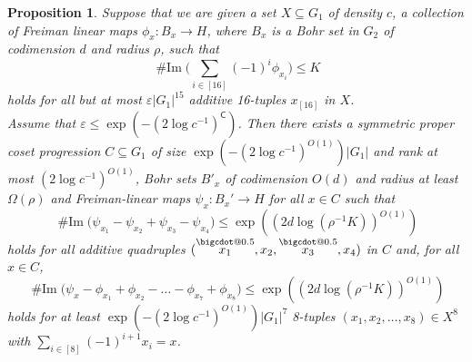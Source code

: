 \documentclass[a4paper,11pt]{article}
\makeatletter
\numberwithin{theorem}{section}
\newtheorem{proposition}[theorem]{Proposition}
\theoremstyle{definition}
\newcommand{\on}[1]{
	\operatorname{#1}
}
\newcommand\range{\on{\# Im}}
\newcommand*\bcdot{\mathpalette\bigcdot@{0.5}}
\newcommand*\bigcdot@[2]{\mathbin{\vcenter{\hbox{\scalebox{#2}{$\m@th#1\bullet$}}}}}
\newcommand{\blc}{\bm{\mathsf{C}}}
\newcommand{\upd}[1]{\overset{\bcdot}{#1}}
\makeatother
\begin{document}
\begin{proposition}\label{smallimgoncosetprogressionlinsys}
    Suppose that we are given a set $X \subseteq G_1$ of density $c$, a collection of Freiman linear maps $\phi_x : B_x \to H$, where $B_x$ is a Bohr set in $G_2$ of codimension $d$ and radius $\rho$, such that 
    \begin{equation}\range\Big(\sum_{i \in [16]} (-1)^i \phi_{x_i}\Big) \leq K \label{bad16tuplesrbrstep}\end{equation}
    holds for all but at most $\varepsilon |G_1|^{15}$ additive 16-tuples $x_{[16]}$ in $X$.\\ 
    \indent Assume that $\varepsilon \leq \exp(-(2\log c^{-1})^{\blc})$. Then there exists a symmetric proper coset progression $C \subseteq G_1$ of size $\exp(-(2\log c^{-1})^{O(1)})|G_1|$ and rank at most $(2\log c^{-1})^{O(1)}$, Bohr sets $B'_x$ of codimension $O(d)$ and radius at least $\Omega(\rho)$ and Freiman-linear maps $\psi_x : B_x' \to H$ for all $x \in C$ such that 
    \[\range\Big(\psi_{x_1} - \psi_{x_2} + \psi_{x_3} - \psi_{x_4}\Big) \leq \exp((2d \log (\rho^{-1}K))^{O(1)})\]
    holds for all additive quadruples $(\upd{x_1}, x_2, \upd{x_3}, x_4)$ in $C$ and, for all $x \in C$,
    \[\range\Big(\psi_x - \phi_{x_1} + \phi_{x_2} - \dots - \phi_{x_7} + \phi_{x_8}\Big) \leq \exp((2d \log (\rho^{-1}K))^{O(1)})\]
    holds for at least $\exp(-(2\log c^{-1})^{O(1)})|G_1|^7$ 8-tuples $(x_1, x_2, \dots, x_8) \in X^8$ with $\sum_{i \in [8]} (-1)^{i + 1}x_i = x$.
\end{proposition}
\end{document}
